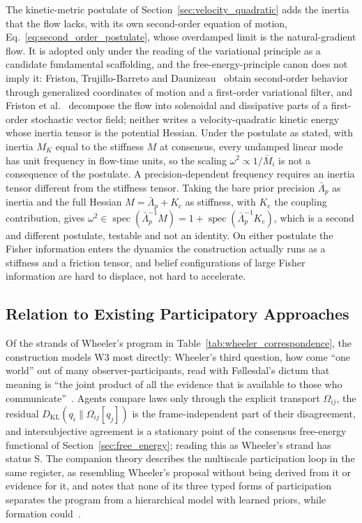 \documentclass[11pt]{article}
\begin{document}
The kinetic-metric postulate of Section~\ref{sec:velocity_quadratic} adds the inertia that the flow lacks, with its own second-order equation of motion, Eq.~\eqref{eq:second_order_postulate}, whose overdamped limit is the natural-gradient flow. It is adopted only under the reading of the variational principle as a candidate fundamental scaffolding, and the free-energy-principle canon does not imply it: Friston, Trujillo-Barreto and Daunizeau~\cite{Friston2008DEM} obtain second-order behavior through generalized coordinates of motion and a first-order variational filter, and Friston et al.~\cite{Friston2023PhysReports} decompose the flow into solenoidal and dissipative parts of a first-order stochastic vector field; neither writes a velocity-quadratic kinetic energy whose inertia tensor is the potential Hessian. Under the postulate as stated, with inertia $M_K$ equal to the stiffness $M$ at consensus, every undamped linear mode has unit frequency in flow-time units, so the scaling $\omega^2 \propto 1/\bar{M}_i$ is not a consequence of the postulate. A precision-dependent frequency requires an inertia tensor different from the stiffness tensor. Taking the bare prior precision $\bar{\Lambda}_p$ as inertia and the full Hessian $M = \bar{\Lambda}_p + K_{\mathrm{c}}$ as stiffness, with $K_{\mathrm{c}}$ the coupling contribution, gives $\omega^2 \in \operatorname{spec}(\bar{\Lambda}_p^{-1}M) = 1 + \operatorname{spec}(\bar{\Lambda}_p^{-1}K_{\mathrm{c}})$, which is a second and different postulate, testable and not an identity. On either postulate the Fisher information enters the dynamics the construction actually runs as a stiffness and a friction tensor, and belief configurations of large Fisher information are hard to displace, not hard to accelerate.

\subsection{Relation to Existing Participatory Approaches}

Of the strands of Wheeler's program in Table~\ref{tab:wheeler_correspondence}, the construction models W3 most directly: Wheeler's third question, how come ``one world'' out of many observer-participants, read with F{\o}llesdal's dictum that meaning is ``the joint product of all the evidence that is available to those who communicate''~\cite{Wheeler1990}. Agents compare laws only through the explicit transport $\Omega_{ij}$, the residual $D_{\mathrm{KL}}(q_i\|\Omega_{ij}[q_j])$ is the frame-independent part of their disagreement, and intersubjective agreement is a stationary point of the consensus free-energy functional of Section~\ref{sec:free_energy}; reading this as Wheeler's strand has status S. The companion theory describes the multiscale participation loop in the same register, as resembling Wheeler's proposal without being derived from it or evidence for it, and notes that none of its three typed forms of participation separates the program from a hierarchical model with learned priors, while formation could~\cite[Ch.~14]{DennisGaugeVFE2026}.
\end{document}
